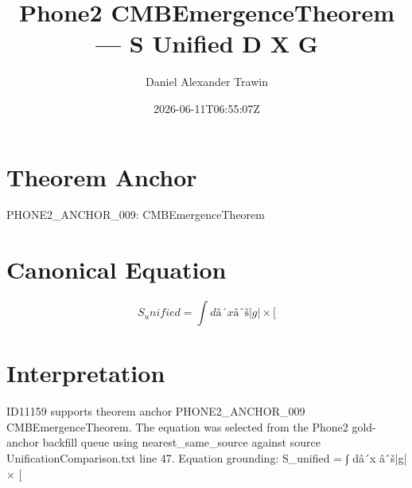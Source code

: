 \documentclass[11pt]{article}
\title{Phone2 CMBEmergenceTheorem — S Unified D X G}
\author{Daniel Alexander Trawin}
\date{2026-06-11T06:55:07Z}
\begin{document}
\maketitle
\section*{Theorem Anchor}
PHONE2_ANCHOR_009: CMBEmergenceTheorem
\section*{Canonical Equation}
\[
S_unified = ∫ dâ´x âˆš|g| × [
\]
\section*{Interpretation}
ID11159 supports theorem anchor PHONE2_ANCHOR_009 CMBEmergenceTheorem. The equation was selected from the Phone2 gold-anchor backfill queue using nearest_same_source against source UnificationComparison.txt line 47. Equation grounding: S_unified = ∫ dâ´x âˆš|g| × [
\end{document}
